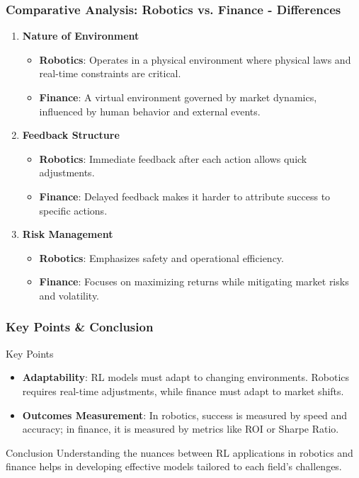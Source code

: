 \documentclass[aspectratio=169]{beamer}
\begin{document}
\begin{frame}[fragile]
    \frametitle{Comparative Analysis: Robotics vs. Finance - Differences}
    \begin{enumerate}
        \item \textbf{Nature of Environment}
        \begin{itemize}
            \item \textbf{Robotics}: Operates in a physical environment where physical laws and real-time constraints are critical.
            \item \textbf{Finance}: A virtual environment governed by market dynamics, influenced by human behavior and external events.
        \end{itemize}
        
        \item \textbf{Feedback Structure}
        \begin{itemize}
            \item \textbf{Robotics}: Immediate feedback after each action allows quick adjustments.
            \item \textbf{Finance}: Delayed feedback makes it harder to attribute success to specific actions.
        \end{itemize}

        \item \textbf{Risk Management}
        \begin{itemize}
            \item \textbf{Robotics}: Emphasizes safety and operational efficiency.
            \item \textbf{Finance}: Focuses on maximizing returns while mitigating market risks and volatility.
        \end{itemize}
    \end{enumerate}
\end{frame}

\begin{frame}[fragile]
    \frametitle{Key Points & Conclusion}
    \begin{block}{Key Points}
        \begin{itemize}
            \item \textbf{Adaptability}: RL models must adapt to changing environments. Robotics requires real-time adjustments, while finance must adapt to market shifts.
            \item \textbf{Outcomes Measurement}: In robotics, success is measured by speed and accuracy; in finance, it is measured by metrics like ROI or Sharpe Ratio.
        \end{itemize}
    \end{block}

    \begin{block}{Conclusion}
        Understanding the nuances between RL applications in robotics and finance helps in developing effective models tailored to each field's challenges.
    \end{block}
\end{frame}
\end{document}
